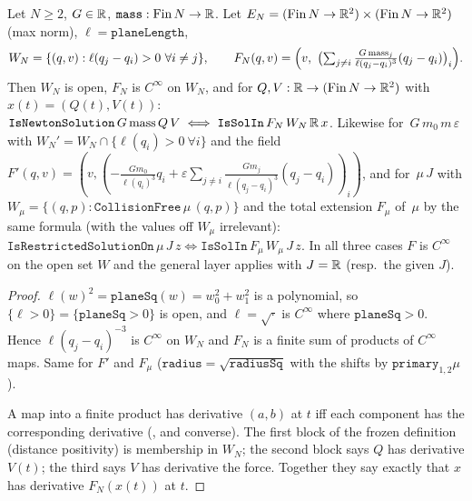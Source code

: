 \begin{proposition}\label{bpN:p3:newton-reduction}
Let $N\ge2$, $G\in\mathbb{R}$, $\texttt{mass}:\text{Fin}\,N\to\mathbb{R}$. Let $E_N=(\text{Fin}\,N\to\mathbb{R}^2)\times(\text{Fin}\,N\to\mathbb{R}^2)$ (max norm), $\ell=\texttt{planeLength}$,
\[
W_N=\{(q,v):\ell(q_j-q_i)>0\ \forall i\ne j\},\qquad
F_N(q,v)=\Bigl(v,\ \bigl(\textstyle\sum_{j\ne i}\tfrac{G\,\mathrm{mass}_j}{\ell(q_j-q_i)^3}(q_j-q_i)\bigr)_i\Bigr).
\]
Then $W_N$ is open, $F_N$ is $C^\infty$ on $W_N$, and for $Q,V:\mathbb{R}\to(\text{Fin}\,N\to\mathbb{R}^2)$ with $x(t)=(Q(t),V(t))$:
$\texttt{IsNewtonSolution}\,G\,\mathrm{mass}\,Q\,V\iff\texttt{IsSolIn}\,F_N\,W_N\,\mathbb{R}\,x$.
Likewise for \,$G\,m_0\,m\,\varepsilon$ with $W_N'=W_N\cap\{\ell(q_i)>0\ \forall i\}$ and the field
$F'(q,v)=(v,(-\frac{Gm_0}{\ell(q_i)^3}q_i+\varepsilon\sum_{j\ne i}\frac{G m_j}{\ell(q_j-q_i)^3}(q_j-q_i))_i)$, and for \,$\mu\,J$ with
$W_\mu=\{(q,p):\texttt{CollisionFree}\,\mu\,(q,p)\}$ and the total extension $F_\mu$ of \,$\mu$ by the same formula
(with the values off $W_\mu$ irrelevant): $\texttt{IsRestrictedSolutionOn}\,\mu\,J\,z\iff\texttt{IsSolIn}\,F_\mu\,W_\mu\,J\,z$.
In all three cases $F$ is $C^\infty$ on the open set $W$ and the general layer applies with $J=\mathbb{R}$ (resp.\ the given $J$).
\end{proposition}
\begin{proof}
\label{stepN:p3:nr-smooth} $\ell(w)^2=\texttt{planeSq}(w)=w_0^2+w_1^2$ is a polynomial, so $\{\ell>0\}=\{\texttt{planeSq}>0\}$ is open, and $\ell=\sqrt{\cdot}$ is $C^\infty$ where $\texttt{planeSq}>0$. Hence $\ell(q_j-q_i)^{-3}$ is $C^\infty$ on $W_N$ and $F_N$ is a finite sum of products of $C^\infty$ maps. Same for $F'$ and $F_\mu$ ($\texttt{radius}=\sqrt{\texttt{radiusSq}}$ with the shifts by $\texttt{primary}_{1,2}\mu$).

\label{stepN:p3:nr-pair} A map into a finite product has derivative $(a,b)$ at $t$ iff each component has the corresponding derivative (,  and converse). The first block of the frozen definition (distance positivity) is membership in $W_N$; the second block says $Q$ has derivative $V(t)$; the third says $V$ has derivative the force. Together they say exactly that $x$ has derivative $F_N(x(t))$ at $t$.
\end{proof}

